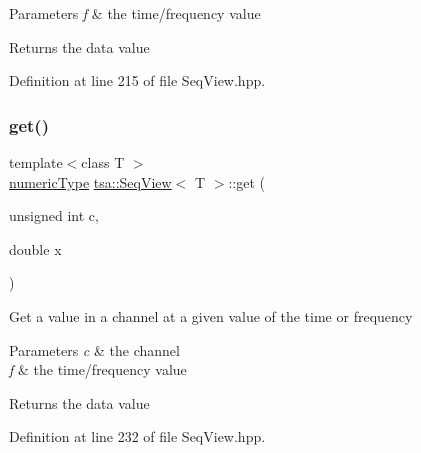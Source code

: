 \begin{DoxyParams}{Parameters}
{\em f} & the time/frequency value\\
\hline
\end{DoxyParams}
\begin{DoxyReturn}{Returns}
the data value 
\end{DoxyReturn}


Definition at line 215 of file Seq\+View.\+hpp.

\mbox{\label{classtsa_1_1_seq_view_a8d3b068d086682175e4b3ff63b54089d}} 
\subsubsection{\texorpdfstring{get()}{get()}\hspace{0.1cm}{\footnotesize\ttfamily [2/2]}}
{\footnotesize\ttfamily template$<$class T $>$ \\
\hyperlink{classtsa_1_1_seq_view_a72b689db78d0feea3305e62cc3852a1d}{numeric\+Type} \hyperlink{classtsa_1_1_seq_view}{tsa\+::\+Seq\+View}$<$ T $>$\+::get (\begin{DoxyParamCaption}\item[{unsigned int}]{c,  }\item[{double}]{x }\end{DoxyParamCaption})\hspace{0.3cm}{\ttfamily [inline]}}

Get a value in a channel at a given value of the time or frequency


\begin{DoxyParams}{Parameters}
{\em c} & the channel \\
\hline
{\em f} & the time/frequency value\\
\hline
\end{DoxyParams}
\begin{DoxyReturn}{Returns}
the data value 
\end{DoxyReturn}


Definition at line 232 of file Seq\+View.\+hpp.

\mbox{\label{classtsa_1_1_seq_view_aa050543264ee43fe0bf8758b4aedbaee}} 
